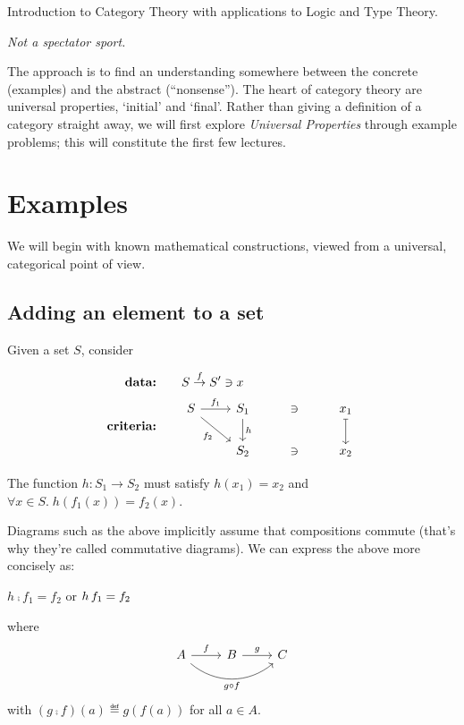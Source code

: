 Introduction to Category Theory with applications to Logic and Type Theory.

\emph{Not a spectator sport.}

The approach is to find an understanding somewhere between the concrete
(examples) and the abstract (``nonsense''). The heart of category theory are
universal properties, `initial' and `final'. 
Rather than giving a definition of a category straight away, we will first
explore \emph{Universal Properties} through example problems; this will
constitute the first few lectures.

\section{Examples}
We will begin with known mathematical constructions, viewed from a universal,
categorical point of view.

\subsection{Adding an element to a set}
\label{add-element-set}

Given a set $S$, consider

\begin{align*}
    \textbf{data:}&\qquad S \overset{f}{\rightarrow} S^\prime \ni x \\
    \textbf{criteria:}& \qquad 
    \begin{tikzcd}[ampersand replacement=\&]
        S \arrow[r, "f_1"]
          \arrow[dr, swap, "f_2"]
          \&
        S_1 \arrow[d, "h"] \& \ni \& x_1 \arrow[d, mapsto]
          \\
          {}\&
        S_2 \& \ni \& x_2
    \end{tikzcd}
\end{align*}

The function $h : S_1 \rightarrow S_2$ must satisfy $h(x_1) = x_2$ and 
$\forall x \in S .\; h(f_1(x)) = f_2(x)$.

\begin{framed}
Diagrams such as the above implicitly assume that compositions commute (that's
why they're called commutative diagrams). We can express the above more
concisely as:
\begin{center}
$h\comp f_1 = f_2$
\quad or \quad
$h\, f_1 = f_2$
\end{center}
where 
$$
\begin{tikzcd}
    A \arrow[r, "f"] \arrow[rr, swap, bend right=40, "g \circ f"] & B \arrow[r, "g"] & C
\end{tikzcd}
$$
with $(g\comp f)(a)\eqdef g(f(a))$ for all $a\in A$.
\end{framed}

